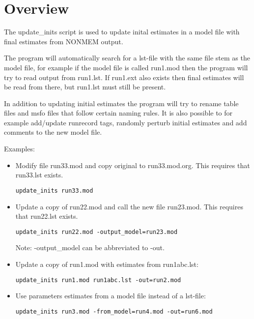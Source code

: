 
\setlength{\evensidemargin}{0pt}
\setlength{\oddsidemargin}{0pt}




\maketitle


\section{Overview}
The update\_inits script is used to 
update inital estimates in a model file with final estimates from NONMEM output.

The program will automatically search for a lst-file with the same file stem as the model file,
for example if the model file is called run1.mod then the program will try to read output from
run1.lst. If run1.ext also exists then final estimates will be read from there, 
but run1.lst must still be present.

In addition to updating initial estimates the program will try to rename table files and
msfo files that follow certain naming rules. It is also possible to for example
add/update runrecord tags,
randomly perturb initial estimates and add comments to the new model file.

\noindent Examples:
\begin{itemize}
\item Modify file run33.mod and copy original to run33.mod.org. This requires that run33.lst exists.
\begin{verbatim}
update_inits run33.mod
\end{verbatim}
\item Update a copy of run22.mod and call the new file run23.mod. This requires that run22.lst exists.
\begin{verbatim}
update_inits run22.mod -output_model=run23.mod
\end{verbatim}
Note: -output\_model can be abbreviated to -out.
\item Update a copy of run1.mod with estimates from run1abc.lst:
\begin{verbatim}
update_inits run1.mod run1abc.lst -out=run2.mod
\end{verbatim}

\item Use parameters estimates from a model file instead of a lst-file:
\begin{verbatim}
update_inits run3.mod -from_model=run4.mod -out=run6.mod
\end{verbatim}
\end{itemize}

